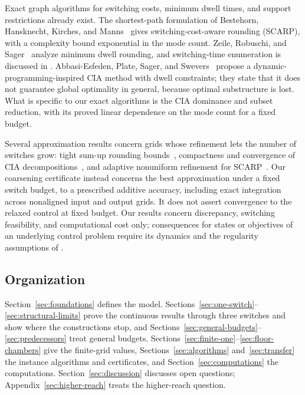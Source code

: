 Exact graph algorithms for switching costs, minimum dwell times, and support
restrictions already exist. The shortest-path formulation of Bestehorn,
Hansknecht, Kirches, and Manns~\cite{bestehorn2021shortest} gives
switching-cost-aware rounding (SCARP), with a complexity bound exponential in
the mode count. Zeile, Robuschi, and Sager~\cite{zeile2021dwell} analyze
minimum dwell rounding, and switching-time enumeration is discussed in
\cite[Section~6.4.3]{zeile2021thesis}. Abbasi-Esfeden, Plate, Sager, and
Swevers~\cite{abbasi2025} propose a dynamic-programming-inspired CIA method
with dwell constraints; they state that it does not guarantee global
optimality in general, because optimal substructure is lost. What is
specific to our exact algorithms is the CIA dominance and subset reduction,
with its proved linear dependence on the mode count for a fixed budget.

Several approximation results concern grids whose refinement lets the number
of switches grow: tight sum-up rounding bounds~\cite{kirches2020tight},
compactness and convergence of CIA decompositions~\cite{kirches2021compact},
and adaptive nonuniform refinement for SCARP~\cite{bestehorn2023adaptive}.
Our coarsening certificate instead concerns the best approximation under a
fixed switch budget, to a prescribed additive accuracy, including exact
integration across nonaligned input and output grids. It does not assert
convergence to the relaxed control at fixed budget. Our results concern
discrepancy, switching feasibility, and computational cost only;
consequences for states or objectives of an underlying control problem
require its dynamics and the regularity assumptions of
\cite[Theorem~1 and Corollary~1]{zeile2022decomposition}.

\subsection{Organization}

Section~\ref{sec:foundations} defines the model.
Sections~\ref{sec:one-switch}--\ref{sec:structural-limits} prove the
continuous results through three switches and show where the constructions
stop, and Sections~\ref{sec:general-budgets}--\ref{sec:predecessors} treat
general budgets. Sections~\ref{sec:finite-one}--\ref{sec:floor-chambers}
give the finite-grid values, Sections~\ref{sec:algorithms}
and~\ref{sec:transfer} the instance algorithms and certificates, and
Section~\ref{sec:computations} the computations.
Section~\ref{sec:discussion} discusses open questions;
Appendix~\ref{sec:higher-reach} treats the higher-reach question.
